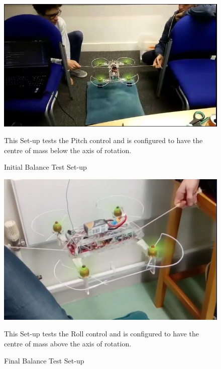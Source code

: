 \documentclass[a4paper,11pt]{article}
\begin{document}
\begin{figure}[!ht]
    \includegraphics[width=\textwidth]{initial_balance.jpg}
    \caption{Initial Balance Test Set-up}
    \medskip
    \small
    \centering
    This Set-up tests the Pitch control and is configured to have the centre of mass below the axis of rotation.
    \label{fig:Initial Balance}
\end{figure}
\begin{figure}[!ht]
    \includegraphics[width=\textwidth]{final_balance.jpg}
    \caption{Final Balance Test Set-up}
    \medskip
    \small
    \centering
    This Set-up tests the Roll control and is configured to have the centre of mass above the axis of rotation.
    \label{fig:Final Balance}
\end{figure}


  
\end{document}
